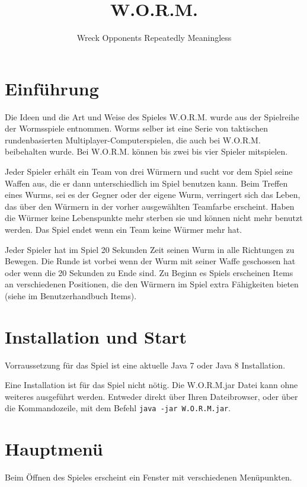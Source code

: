 \documentclass{scrreprt}
\title{W.O.R.M.}
\author{Wreck Opponents Repeatedly Meaningless}
\begin{document}
 
\maketitle
\tableofcontents
\thispagestyle{empty}
\newpage
\setcounter{page}{3}

\chapter{Einführung}
Die Ideen und die Art und Weise des Spieles W.O.R.M. wurde aus der Spielreihe der Worms\-spiele
entnommen. Worms selber ist eine Serie von taktischen rundenbasierten Multiplayer-Computerspielen,
die auch bei W.O.R.M. beibehalten wurde. Bei  W.O.R.M. können bis zwei bis vier Spieler
mitspielen.

Jeder Spieler erhält ein Team von drei Würmern und sucht vor dem Spiel seine Waffen aus, die
er dann unterschiedlich im Spiel benutzen kann. Beim Treffen eines Wurms, sei es der Gegner
oder der eigene Wurm, verringert sich das Leben, das über den Würmern in der vorher
ausgewählten Teamfarbe erscheint. Haben die Würmer keine Lebenspunkte mehr sterben sie und
können nicht mehr benutzt werden. Das Spiel endet wenn ein Team keine Würmer mehr
hat.

Jeder Spieler hat im Spiel 20 Sekunden Zeit seinen Wurm in alle Richtungen zu Bewegen. Die
Runde ist vorbei wenn der Wurm mit seiner Waffe geschossen hat oder wenn die 20 Sekunden
zu Ende sind. Zu Beginn es Spiels erscheinen Items an verschiedenen Positionen, die den Würmern
im Spiel extra Fähigkeiten bieten (siehe im Benutzerhandbuch Items).

\chapter{Installation und Start}
Vorraussetzung für das Spiel ist eine aktuelle Java 7 oder Java 8 Installation.

Eine Installation ist für das Spiel nicht nötig. Die W.O.R.M.jar Datei kann ohne weiteres
ausgeführt werden. Entweder direkt über Ihren Dateibrowser, oder über die Kommandozeile, mit dem
Befehl \texttt{java -jar W.O.R.M.jar}.

\chapter{Hauptmenü}
Beim Öffnen des Spieles erscheint ein Fenster mit verschiedenen Menüpunkten.
\end{document}

